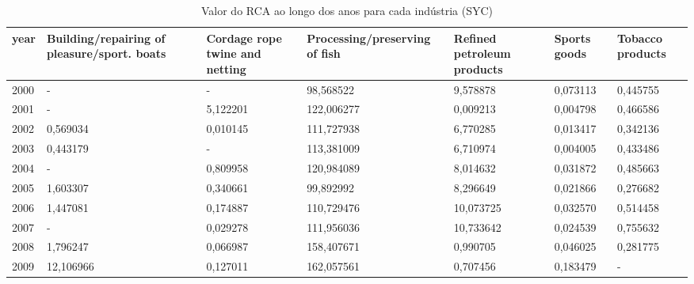 \begin{table}
\centering
\caption{Valor do RCA ao longo dos anos para cada indústria (SYC)}
\begin{tabular}{p{1cm}p{2cm}p{2cm}p{2cm}p{2cm}p{2cm}p{2cm}}
\toprule
 year &  Building/repairing of pleasure/sport. boats &  Cordage rope twine and netting &  Processing/preserving of fish &  Refined petroleum products &  Sports goods &  Tobacco products \\
\midrule
 2000 &                                            - &                               - &                      98,568522 &                    9,578878 &      0,073113 &          0,445755 \\
 2001 &                                            - &                        5,122201 &                     122,006277 &                    0,009213 &      0,004798 &          0,466586 \\
 2002 &                                     0,569034 &                        0,010145 &                     111,727938 &                    6,770285 &      0,013417 &          0,342136 \\
 2003 &                                     0,443179 &                               - &                     113,381009 &                    6,710974 &      0,004005 &          0,433486 \\
 2004 &                                            - &                        0,809958 &                     120,984089 &                    8,014632 &      0,031872 &          0,485663 \\
 2005 &                                     1,603307 &                        0,340661 &                      99,892992 &                    8,296649 &      0,021866 &          0,276682 \\
 2006 &                                     1,447081 &                        0,174887 &                     110,729476 &                   10,073725 &      0,032570 &          0,514458 \\
 2007 &                                            - &                        0,029278 &                     111,956036 &                   10,733642 &      0,024539 &          0,755632 \\
 2008 &                                     1,796247 &                        0,066987 &                     158,407671 &                    0,990705 &      0,046025 &          0,281775 \\
 2009 &                                    12,106966 &                        0,127011 &                     162,057561 &                    0,707456 &      0,183479 &                 - \\

\end{tabular}
\end{table}
